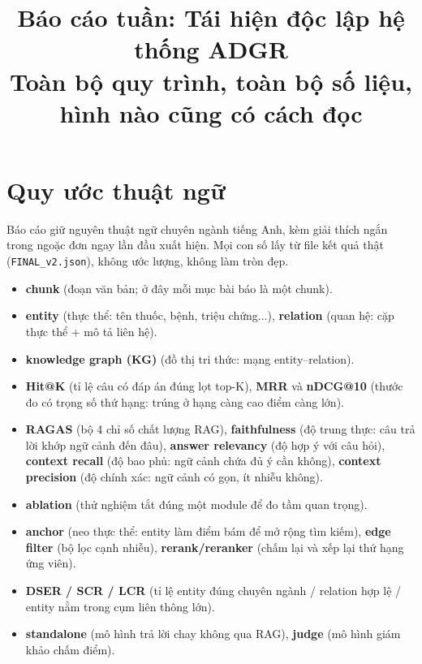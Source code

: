 \documentclass[12pt,a4paper]{article}
\title{Báo cáo tuần: Tái hiện độc lập hệ thống ADGR\\ \large Toàn bộ quy trình, toàn bộ số liệu, hình nào cũng có cách đọc}
\date{}
\begin{document}
\maketitle
\renewcommand{\contentsname}{Mục lục}
\tableofcontents
\newpage

\section{Quy ước thuật ngữ}
Báo cáo giữ nguyên thuật ngữ chuyên ngành tiếng Anh, kèm giải thích ngắn
trong ngoặc đơn ngay lần đầu xuất hiện. Mọi con số lấy từ file kết quả thật
(\texttt{FINAL\_v2.json}), không ước lượng, không làm tròn đẹp.
\begin{itemize}[leftmargin=*]
\item \textbf{chunk} (đoạn văn bản; ở đây mỗi mục bài báo là một chunk).
\item \textbf{entity} (thực thể: tên thuốc, bệnh, triệu chứng...),
\textbf{relation} (quan hệ: cặp thực thể + mô tả liên hệ).
\item \textbf{knowledge graph (KG)} (đồ thị tri thức: mạng entity--relation).
\item \textbf{Hit@K} (tỉ lệ câu có đáp án đúng lọt top-K),
\textbf{MRR} và \textbf{nDCG@10} (thước đo có trọng số thứ hạng: trúng ở
hạng càng cao điểm càng lớn).
\item \textbf{RAGAS} (bộ 4 chỉ số chất lượng RAG),
\textbf{faithfulness} (độ trung thực: câu trả lời khớp ngữ cảnh đến đâu),
\textbf{answer relevancy} (độ hợp ý với câu hỏi),
\textbf{context recall} (độ bao phủ: ngữ cảnh chứa đủ ý cần không),
\textbf{context precision} (độ chính xác: ngữ cảnh có gọn, ít nhiễu không).
\item \textbf{ablation} (thử nghiệm tắt đúng một module để đo tầm quan trọng).
\item \textbf{anchor} (neo thực thể: entity làm điểm bám để mở rộng tìm kiếm),
\textbf{edge filter} (bộ lọc cạnh nhiễu),
\textbf{rerank/reranker} (chấm lại và xếp lại thứ hạng ứng viên).
\item \textbf{DSER / SCR / LCR} (tỉ lệ entity đúng chuyên ngành / relation
hợp lệ / entity nằm trong cụm liên thông lớn).
\item \textbf{standalone} (mô hình trả lời chay không qua RAG),
\textbf{judge} (mô hình giám khảo chấm điểm).
\end{itemize}

\end{document}
